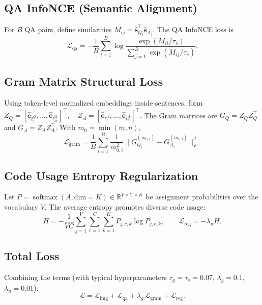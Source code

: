 \documentclass[11pt]{article}
\begin{document}
\subsection{QA InfoNCE (Semantic Alignment)}
For \(B\) QA pairs, define similarities \(M_{ij} = \hat{\mathbf{s}}_{Q_i}^\top \hat{\mathbf{s}}_{A_j}\). The QA InfoNCE loss is
\[
  \mathcal{L}_{\text{qa}} = -\frac{1}{B} \sum_{i=1}^{B} \log \frac{\exp(M_{ii}/\tau_s)}{\sum_{j=1}^{B} \exp(M_{ij}/\tau_s)}.
\]

\subsection{Gram Matrix Structural Loss}
Using token-level normalized embeddings inside sentences, form
\(
  Z_Q = [\hat{\mathbf{e}}_{t_1^Q},\ldots,\hat{\mathbf{e}}_{t_m^Q}]^\top,\quad
  Z_A = [\hat{\mathbf{e}}_{t_1^A},\ldots,\hat{\mathbf{e}}_{t_n^A}]^\top.
\)
The Gram matrices are \(G_Q = Z_Q Z_Q^\top\) and \(G_A = Z_A Z_A^\top\). With \(m_0=\min(m,n)\),
\[
  \mathcal{L}_{\text{gram}} = \frac{1}{B} \sum_{i=1}^{B} \frac{1}{m_{0,i}^2} \big\lVert G_{Q_i}^{(m_{0,i})} - G_{A_i}^{(m_{0,i})} \big\rVert_F^2.
\]

\subsection{Code Usage Entropy Regularization}
Let \(P = \operatorname{softmax}(A, \text{dim}=K) \in \mathbb{R}^{V\times C\times K}\) be assignment probabilities over the vocabulary \(V\). The average entropy promotes diverse code usage:
\[
  H = -\frac{1}{VC} \sum_{j=1}^{V} \sum_{c=1}^{C} \sum_{k=1}^{K} P_{j,c,k} \log P_{j,c,k}, \qquad \mathcal{L}_{\text{reg}} = -\lambda_u H.
\]

\subsection{Total Loss}
Combining the terms (with typical hyperparameters \(\tau_g=\tau_s=0.07\), \(\lambda_g=0.1\), \(\lambda_u=0.01\)):
\[
  \boxed{\mathcal{L} = \mathcal{L}_{\text{img}} + \mathcal{L}_{\text{qa}} + \lambda_g\,\mathcal{L}_{\text{gram}} + \mathcal{L}_{\text{reg}}.}
\]
\end{document}
